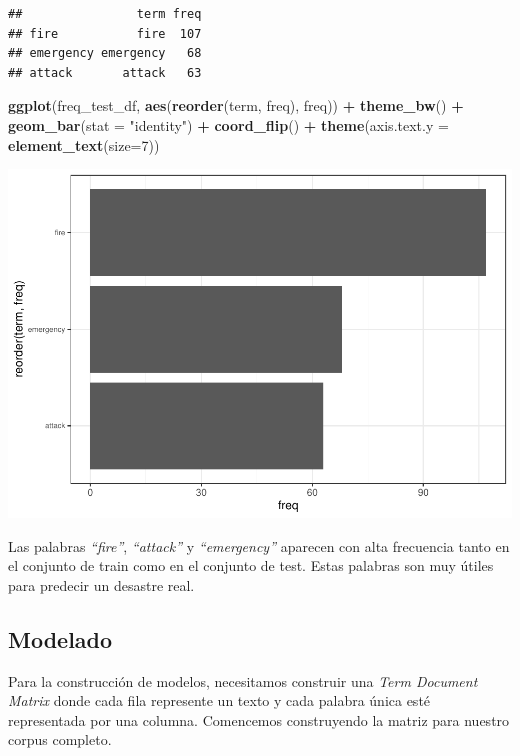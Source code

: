 \documentclass[
]{article}
\newenvironment{Shaded}{\begin{snugshade}}{\end{snugshade}}
\newcommand{\DataTypeTok}[1]{\textcolor[rgb]{0.13,0.29,0.53}{#1}}
\newcommand{\DecValTok}[1]{\textcolor[rgb]{0.00,0.00,0.81}{#1}}
\newcommand{\KeywordTok}[1]{\textcolor[rgb]{0.13,0.29,0.53}{\textbf{#1}}}
\newcommand{\NormalTok}[1]{#1}
\newcommand{\OperatorTok}[1]{\textcolor[rgb]{0.81,0.36,0.00}{\textbf{#1}}}
\newcommand{\StringTok}[1]{\textcolor[rgb]{0.31,0.60,0.02}{#1}}
\begin{document}
\begin{verbatim}
##                term freq
## fire           fire  107
## emergency emergency   68
## attack       attack   63
\end{verbatim}

\begin{Shaded}
\begin{Highlighting}[]
\KeywordTok{ggplot}\NormalTok{(freq_test_df, }\KeywordTok{aes}\NormalTok{(}\KeywordTok{reorder}\NormalTok{(term, freq), freq)) }\OperatorTok{+}\StringTok{ }\KeywordTok{theme_bw}\NormalTok{() }\OperatorTok{+}\StringTok{ }
\StringTok{  }\KeywordTok{geom_bar}\NormalTok{(}\DataTypeTok{stat =} \StringTok{"identity"}\NormalTok{)  }\OperatorTok{+}\StringTok{ }
\StringTok{  }\KeywordTok{coord_flip}\NormalTok{() }\OperatorTok{+}\StringTok{ }
\StringTok{  }\KeywordTok{theme}\NormalTok{(}\DataTypeTok{axis.text.y =} \KeywordTok{element_text}\NormalTok{(}\DataTypeTok{size=}\DecValTok{7}\NormalTok{))}
\end{Highlighting}
\end{Shaded}

\begin{center}\includegraphics[width=0.5\linewidth]{document_files/figure-latex/unnamed-chunk-29-1} \end{center}

Las palabras \emph{``fire''}, \emph{``attack''} y \emph{``emergency''}
aparecen con alta frecuencia tanto en el conjunto de train como en el
conjunto de test. Estas palabras son muy útiles para predecir un
desastre real.

\hypertarget{modelado}{%
\subsection{Modelado}\label{modelado}}

Para la construcción de modelos, necesitamos construir una \emph{Term
Document Matrix} donde cada fila represente un texto y cada palabra
única esté representada por una columna. Comencemos construyendo la
matriz para nuestro corpus completo.
\end{document}
